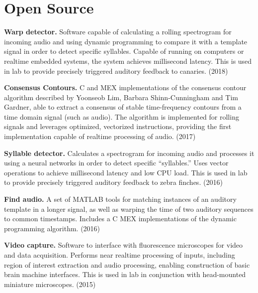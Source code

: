 %    

\section*{Open Source}
	\textbf{Warp detector.} Software capable of calculating a rolling spectrogram for incoming audio and using dynamic programming to compare it with a template signal in order to detect specific syllables. Capable of running on computers or realtime embedded systems, the system achieves millisecond latency. This is used in lab to provide precisely triggered auditory feedback to canaries. (2018)

\bigskip

\noindent
	\textbf{Consensus Contours.} C and MEX implementations of the consensus contour algorithm described by Yoonseob Lim, Barbara Shinn-Cunningham and Tim Gardner, able to extract a consensus of stable time-frequency contours from a time domain signal (such as audio). The algorithm is implemented for rolling signals and leverages optimized, vectorized instructions, providing the first implementation capable of realtime processing of audio. (2017)

\bigskip

\noindent
	\textbf{Syllable detector.} Calculates a spectrogram for incoming audio and processes it using a neural networks in order to detect specific ``syllables.'' Uses vector operations to achieve millisecond latency and low CPU load. This is used in lab to provide precisely triggered auditory feedback to zebra finches. (2016)

\bigskip

\noindent
	\textbf{Find audio.} A set of MATLAB tools for matching instances of an auditory template in a longer signal, as well as warping the time of two auditory sequences to common timestamps. Includes a C MEX implementations of the dynamic programming algorithm. (2016)

\bigskip

\noindent
	\textbf{Video capture.} Software to interface with fluorescence microscopes for video and data acquisition. Performs near realtime processing of inputs, including region of interest extraction and audio processing, enabling construction of basic brain machine interfaces. This is used in lab in conjunction with head-mounted miniature microscopes. (2015)

